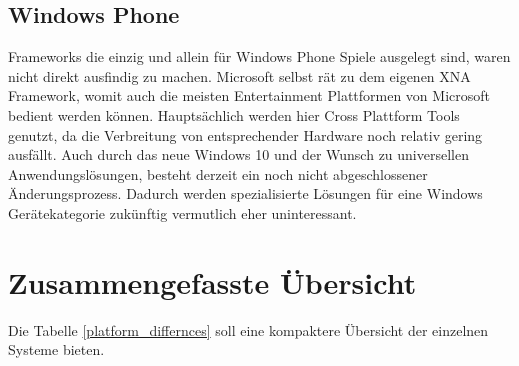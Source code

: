 \subsection{Windows Phone}
Frameworks die einzig und allein für Windows Phone Spiele ausgelegt sind, waren nicht direkt ausfindig zu machen. Microsoft selbst rät zu dem eigenen XNA Framework, womit auch die meisten Entertainment Plattformen von Microsoft bedient werden können. Hauptsächlich werden hier Cross Plattform Tools genutzt, da die Verbreitung von entsprechender Hardware noch relativ gering ausfällt. Auch durch das neue Windows 10 und der Wunsch zu universellen Anwendungslösungen, besteht derzeit ein noch nicht abgeschlossener Änderungsprozess. Dadurch werden spezialisierte Lösungen für eine Windows Gerätekategorie zukünftig vermutlich eher uninteressant.


\section{Zusammengefasste Übersicht}
Die Tabelle \ref{platform_differnces} soll eine kompaktere Übersicht der einzelnen Systeme bieten.

